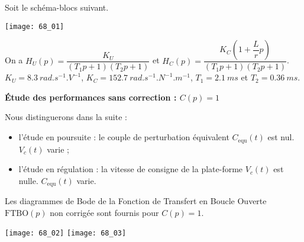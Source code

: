 \normaltrue \difficilefalse \tdifficilefalse
\correctionfalse

\setcounter{question}{0}%


\ifcorrection
\else
{}
\fi

\ifprof
\else

Soit le schéma-blocs suivant. 

\begin{marginfigure}
\texttt{[image: 68\_01]}
\end{marginfigure}

On a $H_U(p) = \dfrac{K_U}{\left( T_1 p +1 \right)\left( T_2 p +1 \right)}$ et $H_C(p) = \dfrac{K_C \left( 1+\dfrac{L}{r}p\right)}{\left( T_1 p +1 \right)\left( T_2 p +1 \right)}$. $K_U =\SI{8,3}{rad.s^{-1}.V^{-1}}$, $K_C = \SI{152,7}{rad.s^{-1}.N^{-1}.m^{-1}}$, $T_1 = \SI{2,1}{ms}$ et $T_2 = \SI{0,36}{ms}$.

\textbf{Étude des performances sans correction : $C( p) =1$}

Nous distinguerons dans la suite :
\begin{itemize}
\item l’étude en poursuite : le couple de perturbation équivalent $C_{\text{equ}} (t)$ est nul. $V_c(t)$ varie ;
\item l’étude en régulation : la vitesse de consigne de la plate-forme $V_c(t)$  est nulle. $C_{\text{equ}} (t)$ varie.
\end{itemize}

Les diagrammes de Bode de la Fonction de Transfert en Boucle Ouverte $\text{FTBO}( p)$ non corrigée sont fournis pour $C( p) = 1$.

\begin{marginfigure}
\texttt{[image: 68\_02]}
\texttt{[image: 68\_03]}
\end{marginfigure}
\fi

\ifprof
\else 
\fi

\ifprof
\else 
\fi

